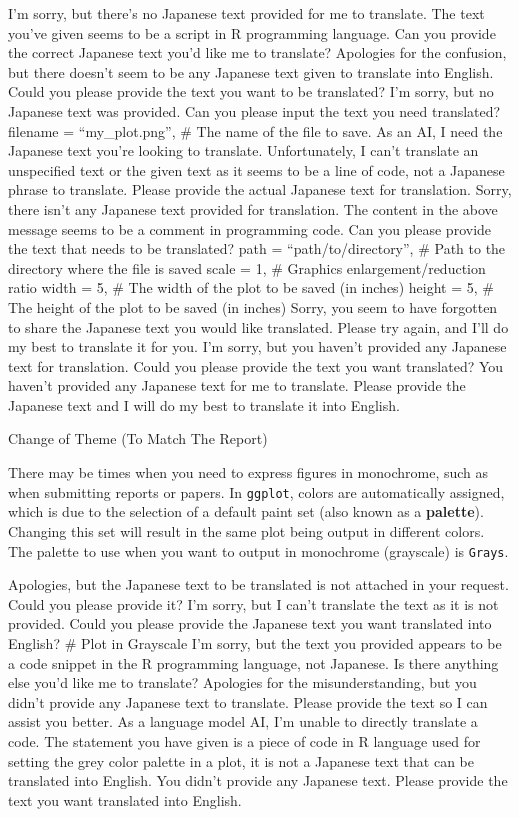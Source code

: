 \documentclass[
  a4paper,
]{book}
\begin{document}
I'm sorry, but there's no Japanese text provided for me to translate.
The text you've given seems to be a script in R programming language.
Can you provide the correct Japanese text you'd like me to translate?
Apologies for the confusion, but there doesn't seem to be any Japanese
text given to translate into English. Could you please provide the text
you want to be translated? I'm sorry, but no Japanese text was provided.
Can you please input the text you need translated? filename =
``my\_plot.png'', \# The name of the file to save. As an AI, I need the
Japanese text you're looking to translate. Unfortunately, I can't
translate an unspecified text or the given text as it seems to be a line
of code, not a Japanese phrase to translate. Please provide the actual
Japanese text for translation. Sorry, there isn't any Japanese text
provided for translation. The content in the above message seems to be a
comment in programming code. Can you please provide the text that needs
to be translated? path = ``path/to/directory'', \# Path to the directory
where the file is saved scale = 1, \# Graphics enlargement/reduction
ratio width = 5, \# The width of the plot to be saved (in inches) height
= 5, \# The height of the plot to be saved (in inches) Sorry, you seem
to have forgotten to share the Japanese text you would like translated.
Please try again, and I'll do my best to translate it for you. I'm
sorry, but you haven't provided any Japanese text for translation. Could
you please provide the text you want translated? You haven't provided
any Japanese text for me to translate. Please provide the Japanese text
and I will do my best to translate it into English.

Change of Theme (To Match The Report)

There may be times when you need to express figures in monochrome, such
as when submitting reports or papers. In \texttt{ggplot}, colors are
automatically assigned, which is due to the selection of a default paint
set (also known as a \textbf{palette}). Changing this set will result in
the same plot being output in different colors. The palette to use when
you want to output in monochrome (grayscale) is \texttt{Grays}.

Apologies, but the Japanese text to be translated is not attached in
your request. Could you please provide it? I'm sorry, but I can't
translate the text as it is not provided. Could you please provide the
Japanese text you want translated into English? \# Plot in Grayscale I'm
sorry, but the text you provided appears to be a code snippet in the R
programming language, not Japanese. Is there anything else you'd like me
to translate? Apologies for the misunderstanding, but you didn't provide
any Japanese text to translate. Please provide the text so I can assist
you better. As a language model AI, I'm unable to directly translate a
code. The statement you have given is a piece of code in R language used
for setting the grey color palette in a plot, it is not a Japanese text
that can be translated into English. You didn't provide any Japanese
text. Please provide the text you want translated into English.
\end{document}
